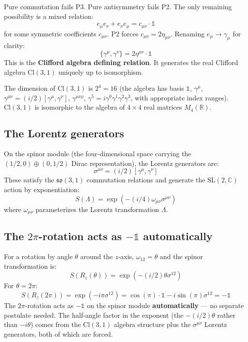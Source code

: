 \documentclass[11pt,a4paper]{article}
\begin{document}
Pure commutation fails P3. Pure antisymmetry fails P2. The only remaining possibility is a mixed relation:
\[
e_\mu e_\nu + e_\nu e_\mu = c_{\mu\nu} \cdot \mathbb{1}
\]
for some symmetric coefficients $c_{\mu\nu}$. P2 forces $c_{\mu\nu} = 2\eta_{\mu\nu}$. Renaming $e_\mu \to \gamma_\mu$ for clarity:
\[
\{\gamma^\mu, \gamma^\nu\} = 2\eta^{\mu\nu} \cdot \mathbb{1}
\]
This is the \textbf{Clifford algebra defining relation}. It generates the real Clifford algebra $\mathrm{Cl}(3,1)$ uniquely up to isomorphism.

The dimension of $\mathrm{Cl}(3,1)$ is $2^{4} = 16$ (the algebra has basis $\mathbb{1}$, $\gamma^\mu$, $\gamma^{\mu\nu} = (i/2)[\gamma^\mu, \gamma^\nu]$, $\gamma^{\mu\nu\rho}$, $\gamma^{5} = i\gamma^{0}\gamma^{1}\gamma^{2}\gamma^{3}$, with appropriate index ranges). $\mathrm{Cl}(3,1)$ is isomorphic to the algebra of $4 \times 4$ real matrices $M_4(\mathbb{R})$.

\subsection{The Lorentz generators}

On the spinor module (the four-dimensional space carrying the $(1/2,0) \oplus (0,1/2)$ Dirac representation), the Lorentz generators are:
\[
\sigma^{\mu\nu} = (i/2)[\gamma^\mu, \gamma^\nu]
\]
These satisfy the $\mathfrak{so}(3,1)$ commutation relations and generate the $\mathrm{SL}(2,\mathbb{C})$ action by exponentiation:
\[
S(\Lambda) = \exp(-(i/4)\omega_{\mu\nu} \sigma^{\mu\nu})
\]
where $\omega_{\mu\nu}$ parameterizes the Lorentz transformation $\Lambda$.

\subsection{The $2\pi$-rotation acts as $-\mathbb{1}$ automatically}

For a rotation by angle $\theta$ around the $z$-axis, $\omega_{12} = \theta$ and the spinor transformation is:
\[
S(R_z(\theta)) = \exp(-(i/2)\theta \sigma^{12})
\]
For $\theta = 2\pi$:
\[
S(R_z(2\pi)) = \exp(-i\pi \sigma^{12}) = \cos(\pi) \cdot \mathbb{1} - i \sin(\pi) \sigma^{12} = -\mathbb{1}
\]
The $2\pi$-rotation acts as $-\mathbb{1}$ on the spinor module \textbf{automatically} --- no separate postulate needed. The half-angle factor in the exponent (the $-(i/2)\theta$ rather than $-i\theta$) comes from the $\mathrm{Cl}(3,1)$ algebra structure plus the $\sigma^{\mu\nu}$ Lorentz generators, both of which are forced.
\end{document}
